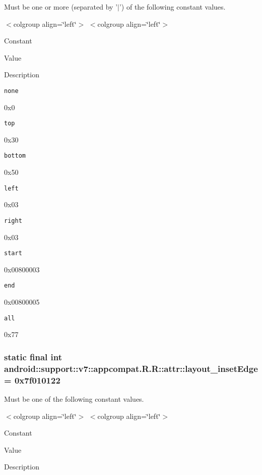 Must be one or more (separated by '$|$') of the following constant values. \begin{TabularC}{0}
\hline
\end{TabularC}
$<$colgroup align=\char`\"{}left\char`\"{}$>$ $<$colgroup align=\char`\"{}left\char`\"{}$>$ 

Constant

Value

Description 

{\tt none}

0x0

{\tt top}

0x30

{\tt bottom}

0x50

{\tt left}

0x03

{\tt right}

0x03

{\tt start}

0x00800003

{\tt end}

0x00800005

{\tt all}

0x77\hypertarget{classandroid_1_1support_1_1v7_1_1appcompat_1_1_r_1_1attr_d2da71c9aa5be417759290945162974d}{
\subsubsection[{layout\_\-insetEdge}]{\setlength{\rightskip}{0pt plus 5cm}static final int android::support::v7::appcompat.R.R::attr::layout\_\-insetEdge = 0x7f010122}}
\label{classandroid_1_1support_1_1v7_1_1appcompat_1_1_r_1_1attr_d2da71c9aa5be417759290945162974d}


Must be one of the following constant values. \begin{TabularC}{0}
\hline
\end{TabularC}
$<$colgroup align=\char`\"{}left\char`\"{}$>$ $<$colgroup align=\char`\"{}left\char`\"{}$>$ 

Constant

Value

Description 

